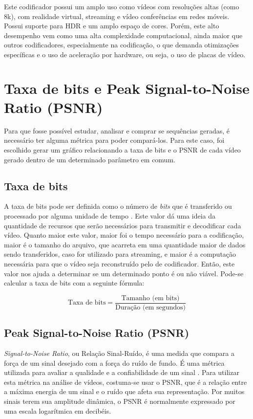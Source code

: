Este codificador possui um amplo uso como vídeos com resoluções altas (como 8k), com realidade
virtual, streaming e vídeo conferências em redes móveis. Possui suporte para HDR e um amplo
espaço de cores. Porém, este alto desempenho vem como uma alta complexidade computacional,
ainda maior que outros codificadores, especialmente na codificação, o que demanda otimizações
específicas e o uso de aceleração por hardware, ou seja, o uso de placas de vídeo. \cite{vvc_paper}

\section{Taxa de bits e Peak Signal-to-Noise Ratio (PSNR)}

Para que fosse possível estudar, analisar e comprar se sequências geradas, é necessário
ter alguma métrica para poder compará-los. Para este caso, foi escolhido gerar um
gráfico relacionando a taxa de bits e o \acrshort{PSNR} de cada vídeo gerado
dentro de um determinado parâmetro em comum.

\subsection{Taxa de bits}

A taxa de bits pode ser definida como o número de \textit{bits} que é transferido
ou processado por alguma unidade de tempo \cite{gupta2006data}. Este valor dá uma
ideia da quantidade de recursos que serão necessários para transmitir e decodificar cada
vídeo. Quanto maior este valor, maior foi o tempo necessário para a codificação,
maior é o tamanho do arquivo, que acarreta em uma quantidade maior de dados sendo
transferidos, caso for utilizado para streaming, e maior é a computação necessária
para que o vídeo seja reconstruído pelo de codificador. Então, este valor nos ajuda
a determinar se um determinado ponto é ou não viável. Pode-se calcular a taxa de bits
 com a seguinte fórmula:

\[
\text{Taxa de bits} = \frac{\text{Tamanho (em bits)}}{\text{Duração (em segundos)}}
\]

\subsection{Peak Signal-to-Noise Ratio (PSNR)}

\textit{Signal-to-Noise Ratio}, ou Relação Sinal-Ruído, é uma medida que compara a força
de um sinal desejado com a força do ruído de fundo. É uma métrica utilizada para avaliar
a qualidade e a confiabilidade de um sinal \cite{gupta2006data}. Para utilizar esta
métrica na análise de vídeos, costuma-se usar o \acrshort{PSNR}, que é a relação entre 
a máxima energia de um sinal e o ruído que afeta sua representação. Por muitos sinais
terem sua amplitude dinâmica, o \acrshort{PSNR} é normalmente expressado por uma escala
logarítmica em decibéis.

